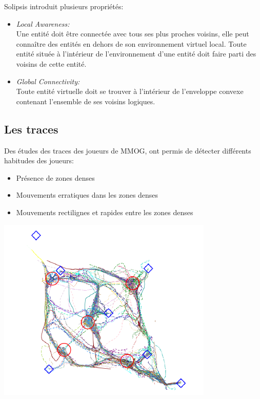 \documentclass{beamer}
\begin{document}
  \begin{frame}
	Solipsis introduit plusieurs propriétés:
	\begin{itemize}
                \item \textit{Local Awareness:}\\
                Une entité doit être connectée avec tous ses plus proches voisins, elle peut connaître des entités en dehors de son environnement virtuel local. Toute entité située à l'intérieur de l'environnement d'une entité doit faire parti des voisins de cette entité.
                \item \textit{Global Connectivity:}\\
                Toute entité virtuelle doit se trouver à l'intérieur de l'enveloppe convexe contenant l'ensemble de ses voisins logiques. \\
	\end{itemize}
  \end{frame}

  \subsection{Les traces}
  \begin{frame}
	Des études des traces des joueurs de MMOG, ont permis de détecter différents habitudes des joueurs:
	\begin{itemize}
		\item Présence de zones denses 
		\item Mouvements erratiques dans les zones denses
		\item Mouvements rectilignes et rapides entre les zones denses
	\end{itemize}
	\begin{center}
        \includegraphics[scale=0.35]{./Ressources/Images/trace.png}\\
        \end{center}
  \end{frame}
\end{document}
